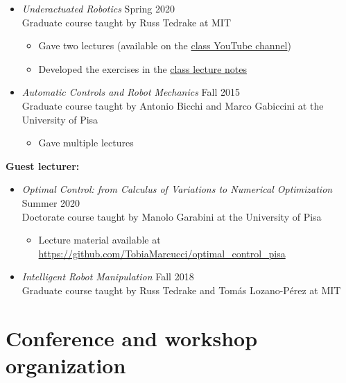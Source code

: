 \documentclass[11pt,a4paper,sans]{moderncv}
\begin{document}
\begin{itemize}

\item \textit{Underactuated  Robotics} \hfill Spring 2020 \\
Graduate course taught by Russ Tedrake at MIT
\begin{itemize}
\item
Gave two lectures (available on the  \href{https://www.youtube.com/playlist?list=PLkx8KyIQkMfX1WpWYqtep7TOmboZeDtev}{\color{cyan}class YouTube channel})
\item
Developed the exercises in the \href{http://underactuated.csail.mit.edu}{\color{cyan}class lecture notes}
\end{itemize}

\item \textit{Automatic Controls and Robot Mechanics} \hfill Fall 2015 \\
Graduate course taught by Antonio Bicchi and Marco Gabiccini at the University of Pisa
\begin{itemize}
\item
Gave multiple lectures
\end{itemize}

\end{itemize}

\textbf{Guest lecturer:}

\begin{itemize}

\item \textit{Optimal Control: from Calculus of Variations to Numerical Optimization} \hfill Summer 2020 \\
Doctorate course taught by Manolo Garabini at the University of Pisa
\begin{itemize}
\item
Lecture material available at \href{https://github.com/TobiaMarcucci/optimal_control_pisa}{\color{cyan}https://github.com/TobiaMarcucci/optimal\_control\_pisa}
\end{itemize}

\item \textit{Intelligent Robot Manipulation} \hfill Fall 2018 \\
Graduate course taught by Russ Tedrake and Tom\'{a}s Lozano-P\'{e}rez at MIT

\end{itemize}


\section{Conference and workshop organization}
\end{document}
